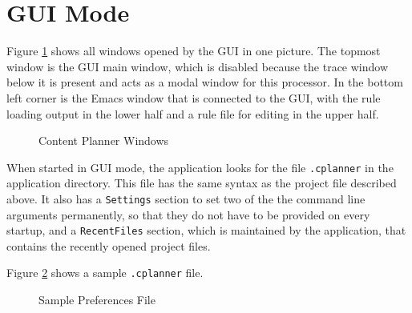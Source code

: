 \documentclass[11pt,a4paper]{article}
\begin{document}

\section{GUI Mode}

Figure \ref{fig:allguiwindows} shows all windows opened by the GUI in one
picture. The topmost window is the GUI main window, which is disabled because
the trace window below it is present and acts as a modal window for this
processor. In the bottom left corner is the Emacs window that is connected
to the GUI, with the rule loading output in the lower half and a rule file
for editing in the upper half.

\begin{figure}[htbp]
  \centering
  \caption{Content Planner Windows}
  \label{fig:allguiwindows}
\end{figure}

When started in GUI mode, the application looks for the file \texttt{.cplanner}
in the application directory. This file has the same syntax as the project
file described above. It also has a \texttt{Settings} section to set two of the
the command line arguments permanently, so that they do not have to be provided
on every startup, and a \texttt{RecentFiles} section, which is maintained by
the application, that contains the recently opened project files.

Figure \ref{fig:preferencesfile} shows a sample \texttt{.cplanner} file.

\begin{figure}[htbp]
  \centering
  \centering{}

  \caption{Sample Preferences File}
  \label{fig:preferencesfile}
\end{figure}
\end{document}
